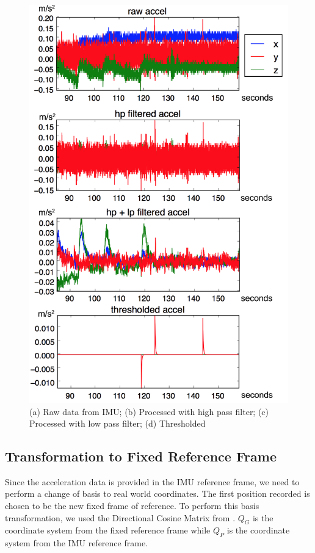 \documentclass[10pt,journal]{IEEEtran}
\begin{document}
\begin{figure}[h]
  \centering
    \includegraphics[width=0.9\linewidth]{figures/filtering}
  \caption{(a) Raw data from IMU; (b) Processed with high pass filter; (c) Processed with low pass filter; (d) Thresholded}
  \label{fig:filtering}
\end{figure}

\subsection{Transformation to Fixed Reference Frame}
  Since the acceleration data is provided in the IMU reference frame, we need to perform a change of basis to real world coordinates. The first position recorded is chosen to be the new fixed frame of reference. To perform this basis transformation, we used the Directional Cosine Matrix from \cite{PB}. $Q_G$ is the coordinate system from the fixed reference frame while $Q_P$ is the coordinate system from the IMU reference frame.
\end{document}
